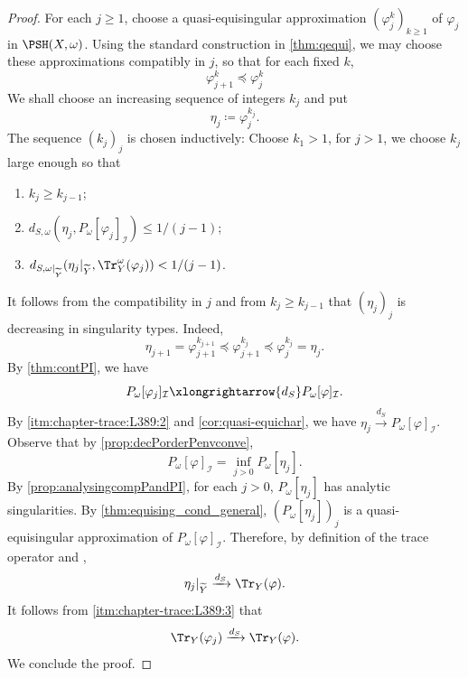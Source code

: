 \begin{proof}
    For each $j\geq 1$, choose a quasi-equisingular approximation $(\varphi_j^k)_{k\geq 1}$ of $\varphi_j$ in $\PSH(X,\omega)$. Using the standard construction in \cref{thm:qequi}, we may choose these approximations compatibly in $j$, so that for each fixed $k$,
    \[
        \varphi_{j+1}^k\preceq \varphi_j^k
    \]
    We shall choose an increasing sequence of integers $k_j$ and put
    \[
        \eta_j\coloneqq \varphi_j^{k_j}.
    \]
    The sequence $(k_j)_j$ is chosen inductively: Choose $k_1>1$, for $j>1$, we choose $k_j$ large enough so that
    \begin{enumerate}
        \item\label{itm:chapter-trace:L389:1} $k_{j}\geq k_{j-1}$;
        \item\label{itm:chapter-trace:L389:2} $d_{S,\omega}(\eta_j,P_{\omega}[\varphi_j]_{\mathcal{I}})\leq 1/(j-1)$;
        \item\label{itm:chapter-trace:L389:3} $d_{S,\omega|_{\widetilde{Y}}}(\eta_j|_{\widetilde{Y}},\Tr_Y^{\omega}(\varphi_j))<1/(j-1)$.
    \end{enumerate}
    It follows from the compatibility in $j$ and from $k_j\geq k_{j-1}$ that $(\eta_j)_j$ is decreasing in singularity types. Indeed,
    \[
        \eta_{j+1}=\varphi_{j+1}^{k_{j+1}}\preceq \varphi_{j+1}^{k_j}\preceq \varphi_j^{k_j}=\eta_j.
    \]
    By \cref{thm:contPI}, we have
    \[
        P_{\omega}[\varphi_j]_{\mathcal{I}}\xlongrightarrow{d_S} P_{\omega}[\varphi]_{\mathcal{I}}.
    \]
    By \ref{itm:chapter-trace:L389:2} and \cref{cor:quasi-equichar}, we have $\eta_j\xrightarrow{d_S} P_{\omega}[\varphi]_{\mathcal{I}}$. Observe that by \cref{prop:decPorderPenvconve},
    \[
        P_{\omega}[\varphi]_{\mathcal{I}}=\inf_{j>0} P_{\omega}\left[\eta_j\right].
    \]
    By \cref{prop:analysingcompPandPI}, for each $j>0$, $P_{\omega}[\eta_j]$ has analytic singularities. By \cref{thm:equising_cond_general}, $(P_{\omega}[\eta_j])_j$ is a quasi-equisingular approximation of $P_{\omega}[\varphi]_{\mathcal{I}}$. Therefore, by definition of the trace operator and ,
    \[
        \eta_j|_{\widetilde{Y}}\xrightarrow{d_S} \Tr_Y(\varphi).
    \]
    It follows from \ref{itm:chapter-trace:L389:3} that
    \[
        \Tr_Y(\varphi_j)\xrightarrow{d_S}\Tr_Y(\varphi).
    \]
    We conclude the proof.
\end{proof}

